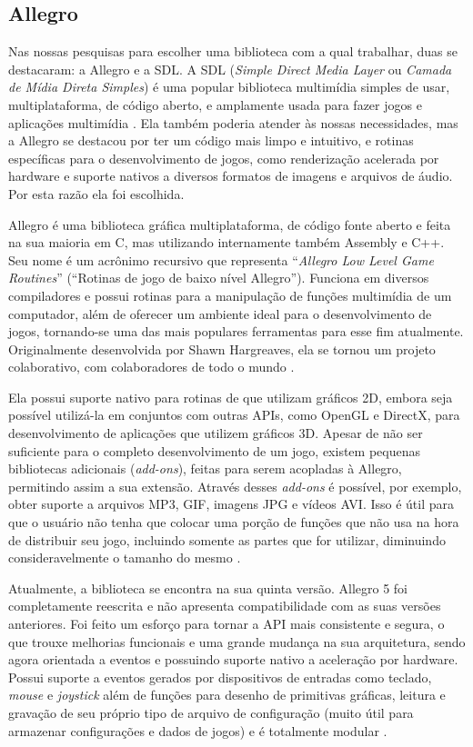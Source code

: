\subsection{Allegro}
\label{allegro}
%
Nas nossas pesquisas para escolher uma biblioteca com a qual trabalhar, duas se destacaram: a Allegro e a SDL. A SDL (\textit{Simple Direct Media Layer} ou \textit{Camada de Mídia Direta Simples}) é uma popular biblioteca multimídia simples de usar, multiplataforma, de código aberto, e amplamente usada para fazer jogos e aplicações multimídia \cite{SDLDoc}. Ela também poderia atender às nossas necessidades, mas a Allegro se destacou por ter um código mais limpo e intuitivo, e rotinas específicas para o desenvolvimento de jogos, como renderização acelerada por hardware e suporte nativos a diversos formatos de imagens e arquivos de áudio. Por esta razão ela foi escolhida.
\par 
Allegro é uma biblioteca gráfica multiplataforma, de código fonte aberto e feita na sua maioria em C, mas utilizando internamente também Assembly e C++. Seu nome é um acrônimo recursivo que representa ``\textit{Allegro Low Level Game Routines}'' (``Rotinas de jogo de baixo nível Allegro''). Funciona em diversos compiladores e possui rotinas para a manipulação de funções multimídia de um computador, além de oferecer um ambiente ideal para o desenvolvimento de jogos, tornando-se uma das mais populares ferramentas para esse fim atualmente. Originalmente desenvolvida por Shawn Hargreaves, ela se tornou um projeto colaborativo, com colaboradores de todo o mundo \cite{AllegroDoc}.
\par
Ela possui suporte nativo para rotinas de que utilizam gráficos 2D, embora seja possível utilizá-la em conjuntos com outras APIs, como OpenGL e DirectX, para desenvolvimento de aplicações que utilizem gráficos 3D. Apesar de não ser suficiente para o completo desenvolvimento de um jogo, existem pequenas bibliotecas adicionais (\textit{add-ons}), feitas para serem acopladas à Allegro, permitindo assim a sua extensão. Através desses \textit{add-ons} é possível, por exemplo, obter suporte a arquivos MP3, GIF, imagens JPG e vídeos AVI. Isso é útil para que o usuário não tenha que colocar uma porção de funções que não usa na hora de distribuir seu jogo, incluindo somente as partes que for utilizar, diminuindo consideravelmente o tamanho do mesmo \cite{AllegroDoc}.
\par
Atualmente, a biblioteca se encontra na sua quinta versão. Allegro 5 foi completamente reescrita e não apresenta compatibilidade com as suas versões anteriores. Foi feito um esforço para tornar a API mais consistente e segura, o que trouxe melhorias funcionais e uma grande mudança na sua arquitetura, sendo agora orientada a eventos e possuindo suporte nativo a aceleração por hardware. Possui suporte a eventos gerados por dispositivos de entradas como teclado, \textit{mouse} e \textit{joystick} além de funções para desenho de primitivas gráficas, leitura e gravação de seu próprio tipo de arquivo de configuração (muito útil para armazenar configurações e dados de jogos) e é totalmente modular \cite{AllegroDoc}.
